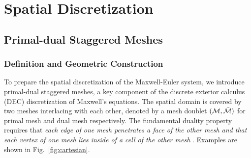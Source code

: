 \documentclass{article}
\begin{document}

\section{Spatial Discretization} \label{sec:spatial_discretization}
\subsection{Primal-dual Staggered Meshes} \label{sec:mesh-duality}
\subsubsection{Definition and Geometric Construction}

To prepare the spatial discretization of the Maxwell-Euler system, we introduce
primal-dual staggered meshes, a key component of the discrete exterior calculus (DEC)
discretization of Maxwell's equations. The spatial domain is covered by two meshes
interlacing with each other, denoted by a mesh doublet
$(\mathcal{M}, \Tilde{\mathcal{M}})$ for primal mesh and dual mesh respectively. The
fundamental duality property requires that \emph{each edge of one mesh penetrates a face
  of the other mesh and that each vertex of one mesh lies inside of a cell of the other
  mesh} \cite[][Sec.~2]{weiland_2003}. Examples are shown in Fig.~\ref{fig:cartesian}.
\end{document}
